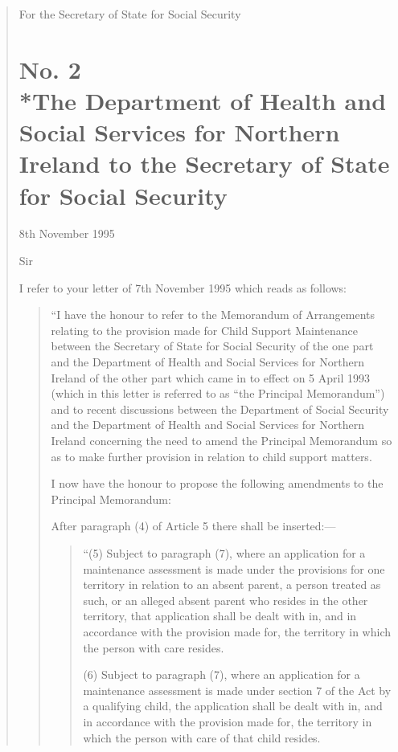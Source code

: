 \documentclass[a4paper]{article}
\begin{document}
\begin{quotation}
  For the Secretary of State for Social Security

\section*{\sloppy No. 2\\*The Department of Health and Social Services for Northern Ireland to the Secretary of State for Social Security}

8th November 1995

  Sir

  I refer to your letter of 7th November 1995 which reads as follows:

\begin{quotation}
  “I have the honour to refer to the Memorandum of Arrangements relating to the provision made for Child Support Maintenance between the Secretary of State for Social Security of the one part and the Department of Health and Social Services for Northern Ireland of the other part which came in to effect on 5 April 1993 (which in this letter is referred to as “the Principal Memorandum”) and to recent discussions between the Department of Social Security and the Department of Health and Social Services for Northern Ireland concerning the need to amend the Principal Memorandum so as to make further provision in relation to child support matters.

\begin{sloppypar}
  I now have the honour to propose the following amendments to the Principal Memorandum:
\end{sloppypar}

\begin{sloppypar}
  After paragraph (4) of Article 5 there shall be inserted:—
\end{sloppypar}
\begin{quotation}
 “(5) Subject to paragraph (7), where an application for a maintenance assessment is made under the provisions for one territory in relation to an absent parent, a person treated as such, or an alleged absent parent who resides in the other territory, that application shall be dealt with in, and in accordance with the provision made for, the territory in which the person with care resides.

(6) Subject to paragraph (7), where an application for a maintenance assessment is made under section 7 of the Act by a qualifying child, the application shall be dealt with in, and in accordance with the provision made for, the territory in which the person with care of that child resides.


\end{quotation}
\end{quotation}
\end{quotation}
\end{document}
